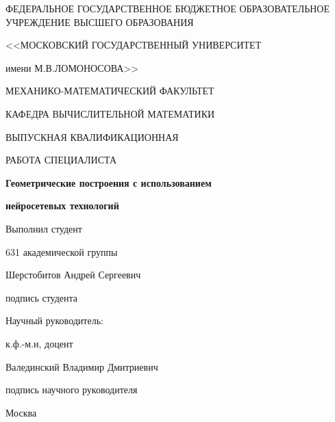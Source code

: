 \begin{titlepage}
  \begin{center}
    ФЕДЕРАЛЬНОЕ ГОСУДАРСТВЕННОЕ БЮДЖЕТНОЕ ОБРАЗОВАТЕЛЬНОЕ УЧРЕЖДЕНИЕ ВЫСШЕГО ОБРАЗОВАНИЯ

    <<МОСКОВСКИЙ ГОСУДАРСТВЕННЫЙ УНИВЕРСИТЕТ

    имени М.В.ЛОМОНОСОВА>>

    \vspace{0.7cm}

    МЕХАНИКО-МАТЕМАТИЧЕСКИЙ ФАКУЛЬТЕТ

    \vspace{0.7cm}

    КАФЕДРА ВЫЧИСЛИТЕЛЬНОЙ МАТЕМАТИКИ 

    \vspace{3cm}

    ВЫПУСКНАЯ КВАЛИФИКАЦИОННАЯ
		
		РАБОТА СПЕЦИАЛИСТА

    \vspace{0.7cm}

    \textbf{Геометрические построения с использованием}
		
		\textbf{нейросетевых технологий}

  \end{center}

  \vspace{2cm}

  \hfill
  \begin{minipage}{0.5\textwidth}
    Выполнил студент

    631 академической группы 

    Шерстобитов Андрей Сергеевич

    \vspace{1cm}

    \underline{\hspace{4cm}}

    подпись студента

    \vspace{0.5cm}

    Научный руководитель:

    к.ф.-м.н, доцент 

    Валединский Владимир Дмитриевич

    \vspace{1cm}

    \underline{\hspace{4cm}}

    подпись научного руководителя
 \end{minipage}

  \vfill

  \begin{center}
    \large Москва

    \the\year
  \end{center}

\end{titlepage}
